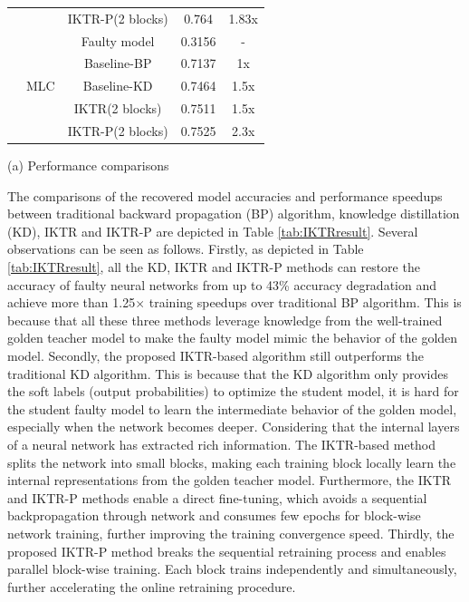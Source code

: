 \begin{table}
\begin{tabular}{@{}c|c|c|c|c}
        &                      & IKTR-P(2 blocks) & 0.764   & 1.83x   \\ \cline{2-5} 
        & \multirow{5}{*}{MLC} & Faulty model     & 0.3156   & -       \\
        &                      & Baseline-BP      & 0.7137   & 1x      \\
        &                      & Baseline-KD      & 0.7464   & 1.5x    \\
        &                      & IKTR(2 blocks)   & 0.7511   & 1.5x    \\
        &                      & IKTR-P(2 blocks) & 0.7525   & 2.3x    \\ \hline 
    \end{tabular}
    \vspace{-20pt}
\end{table}

(a) Performance comparisons


The comparisons of the recovered model accuracies and performance speedups between traditional backward propagation (BP) algorithm, knowledge distillation (KD), IKTR and IKTR-P are depicted in Table \ref{tab:IKTRresult}.
Several observations can be seen as follows. Firstly, as depicted in Table \ref{tab:IKTRresult}, all the KD, IKTR and IKTR-P methods can restore the accuracy of faulty neural networks from up to {43\%} accuracy degradation and achieve more than 1.25$\times$ training speedups over traditional BP algorithm. This is because that all these three methods leverage knowledge from the well-trained golden teacher model to make the faulty model mimic the behavior of the golden model. Secondly, the proposed IKTR-based algorithm
still outperforms the traditional KD algorithm. This is because that the KD algorithm only provides the soft labels (output probabilities) to optimize the student model, it is hard for the student faulty model to learn the intermediate behavior of the golden model, especially when the network
becomes deeper. Considering that the internal layers of a neural network has extracted rich information. The IKTR-based method splits the network into small blocks, making each training block locally learn the internal representations from the golden teacher model. Furthermore, the IKTR and IKTR-P methods enable a direct fine-tuning, which avoids a sequential backpropagation through network and consumes few epochs for block-wise network training, further improving the training convergence speed. Thirdly, the proposed IKTR-P method breaks the sequential retraining process and enables parallel block-wise training. Each block trains independently and simultaneously, further accelerating the online retraining procedure.

